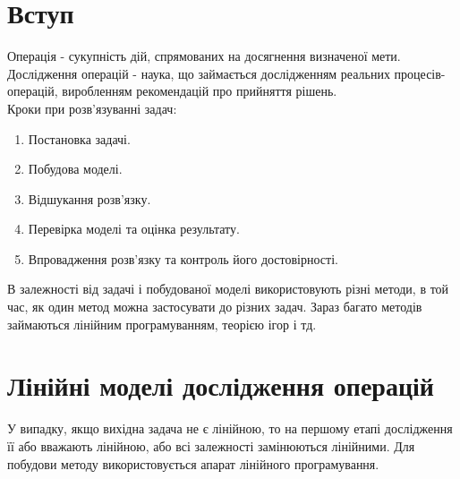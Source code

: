 \documentclass[12pt]{book}
\begin{document}
\tableofcontents
\chapter{Вступ}
Операція - сукупність дій, спрямованих на досягнення визначеної мети.
Дослідження операцій - наука, що займається дослідженням реальних процесів-операцій, виробленням рекомендацій про прийняття рішень.\\
Кроки при розв'язуванні задач:
\begin{enumerate}
\item Постановка задачі.
\item Побудова моделі.
\item Відшукання розв'язку.
\item Перевірка моделі та оцінка результату.
\item Впровадження розв'язку та контроль його достовірності.
\end{enumerate}
В залежності від задачі і побудованої моделі використовують різні методи, в той час, як один метод можна застосувати до різних задач. Зараз багато методів займаються лінійним програмуванням, теорією ігор і тд.

\chapter{Лінійні моделі дослідження операцій}
У випадку, якщо вихідна задача не є лінійною, то на першому етапі дослідження її або вважають лінійною, або всі залежності замінюються лінійними. Для побудови методу використовується апарат лінійного програмування.
\end{document}

